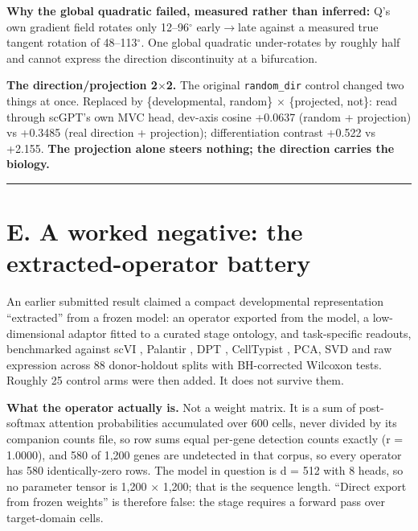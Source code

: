 \textbf{Why the global quadratic failed, measured rather than inferred:} Q's own gradient field rotates only
12--96\(^{\circ}\) early\(\rightarrow\)late against a measured true tangent rotation of 48--113\(^{\circ}\). One global quadratic
under-rotates by roughly half and cannot express the direction discontinuity at a bifurcation.

\textbf{The direction/projection 2\(\times\)2.} The original \texttt{random\_dir} control changed two things at once.
Replaced by \{developmental, random\} \(\times\) \{projected, not\}: read through scGPT's own MVC head, dev-axis
cosine +0.0637 (random + projection) vs +0.3485 (real direction + projection); differentiation contrast
+0.522 vs +2.155. \textbf{The projection alone steers nothing; the direction carries the biology.}

\begin{center}\rule{0.5\linewidth}{0.5pt}\end{center}

\hypertarget{e.-a-worked-negative-the-extracted-operator-battery}{%
\section{E. A worked negative: the extracted-operator battery}\label{e.-a-worked-negative-the-extracted-operator-battery}}

An earlier submitted result claimed a compact developmental representation ``extracted'' from a frozen
model: an operator exported from the model, a low-dimensional adaptor fitted to a curated stage
ontology, and task-specific readouts, benchmarked against scVI \citep{lopez2018scvi}, Palantir \citep{setty2019palantir}, DPT \citep{haghverdi2016dpt}, CellTypist \citep{dominguezconde2022celltypist}, PCA, SVD and raw expression across 88 donor-holdout splits with BH-corrected Wilcoxon tests. Roughly 25 control arms
were then added. It does not survive them.

\textbf{What the operator actually is.} Not a weight matrix. It is a sum of post-softmax attention
probabilities accumulated over 600 cells, never divided by its companion counts file, so row sums equal
per-gene detection counts exactly (r = 1.0000), and 580 of 1,200 genes are undetected in that corpus,
so every operator has 580 identically-zero rows. The model in question is d = 512 with 8 heads, so no
parameter tensor is 1,200 \(\times\) 1,200; that is the sequence length. ``Direct export from frozen weights'' is
therefore false: the stage requires a forward pass over target-domain cells.


